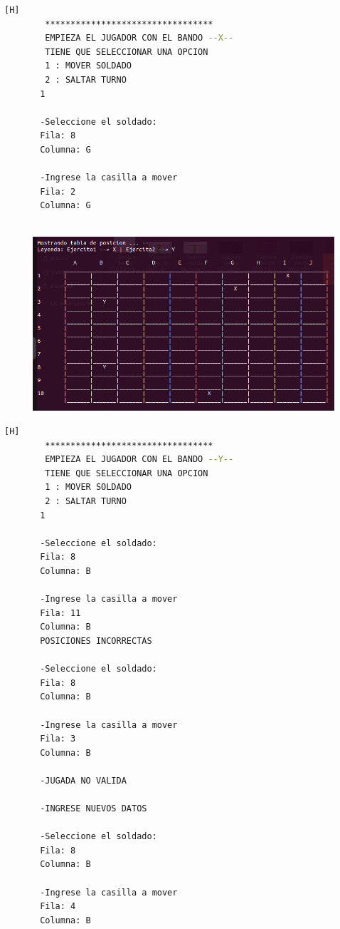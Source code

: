 \documentclass{article}
\begin{document}
	\begin{lstlisting}[language=bash,caption={Ejecucion:}][H]
		*********************************
		EMPIEZA EL JUGADOR CON EL BANDO --X-- 
		TIENE QUE SELECCIONAR UNA OPCION
		1 : MOVER SOLDADO
		2 : SALTAR TURNO
	   1
	   
	   -Seleccione el soldado: 
	   Fila: 8
	   Columna: G
	   
	   -Ingrese la casilla a mover
	   Fila: 2
	   Columna: G
	   
	\end{lstlisting}
	\begin{figure}[H]
		\centering
		\includegraphics[width=1.0\textwidth,keepaspectratio]{img/Commit8.2.png}
	\end{figure}
	\begin{lstlisting}[language=bash,caption={Ejecucion:}][H]
		*********************************
		EMPIEZA EL JUGADOR CON EL BANDO --Y-- 
		TIENE QUE SELECCIONAR UNA OPCION
		1 : MOVER SOLDADO
		2 : SALTAR TURNO
	   1
	   
	   -Seleccione el soldado: 
	   Fila: 8
	   Columna: B
	   
	   -Ingrese la casilla a mover
	   Fila: 11
	   Columna: B
	   POSICIONES INCORRECTAS
	   
	   -Seleccione el soldado: 
	   Fila: 8
	   Columna: B
	   
	   -Ingrese la casilla a mover
	   Fila: 3
	   Columna: B
	   
	   -JUGADA NO VALIDA
	   
	   -INGRESE NUEVOS DATOS
	   
	   -Seleccione el soldado: 
	   Fila: 8
	   Columna: B
	   
	   -Ingrese la casilla a mover
	   Fila: 4
	   Columna: B
	   
	\end{lstlisting}
\end{document}
